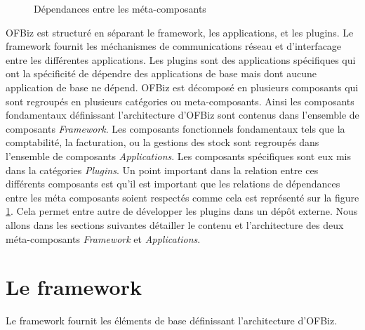 \documentclass[a4paper, 11pt]{report}
\begin{document}

\begin{figure}
  \centering
  \caption{Dépendances entre les méta-composants}
  \label{fig:compdep}
\end{figure}

OFBiz est structuré en séparant le framework, les applications, et les
plugins.  Le framework fournit les méchanismes de communications
réseau et d'interfacage entre les différentes applications.  Les
plugins sont des applications spécifiques qui ont la spécificité de
dépendre des applications de base mais dont aucune application de base
ne dépend.  OFBiz est décomposé en plusieurs composants qui sont
regroupés en plusieurs catégories ou meta-composants. Ainsi les
composants fondamentaux définissant l'architecture d'OFBiz sont
contenus dans l'ensemble de composants \emph{Framework}.  Les
composants fonctionnels fondamentaux tels que la comptabilité, la
facturation, ou la gestions des stock sont regroupés dans l'ensemble
de composants \emph{Applications}.  Les composants spécifiques sont
eux mis dans la catégories \emph{Plugins}. Un point important dans la
relation entre ces différents composants est qu'il est important que
les relations de dépendances entre les méta composants soient
respectés comme cela est représenté sur la figure \ref{fig:compdep}.
Cela permet entre autre de développer les plugins dans un dépôt
externe.  Nous allons dans les sections suivantes détailler le contenu
et l'architecture des deux méta-composants \emph{Framework} et
\emph{Applications}.

\section{Le framework}

Le framework fournit les éléments de base définissant l'architecture
d'OFBiz.
\end{document}

